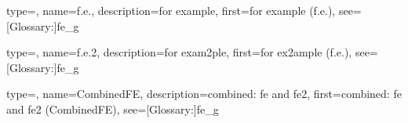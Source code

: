 {
    type=\acronymtype,
    name={f.e.},
    description={for example},
    first={for example (f.e.)},
    see=[Glossary:]{fe_g}
}

{
    type=\acronymtype,
    name={f.e.2},
    description={for exam2ple},
    first={for ex2ample (f.e.)},
    see=[Glossary:]{fe_g}
}

{
    type=\acronymtype,
    name={CombinedFE},
    description={combined: \gls{fe} and \gls{fe2}},
    first={combined: \gls{fe} and \gls{fe2} (CombinedFE)},
    see=[Glossary:]{fe_g}
}